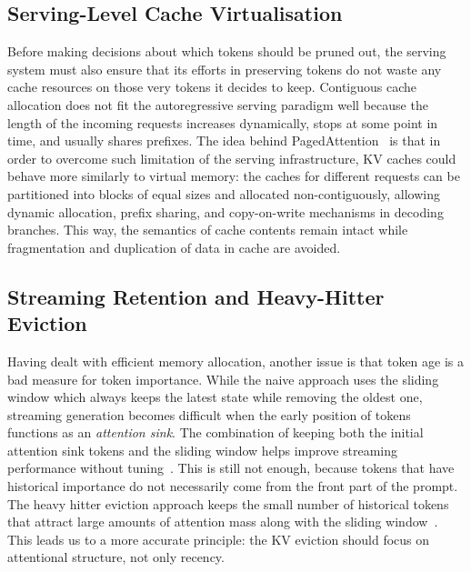 \documentclass[10pt]{article}
\begin{document}
\subsection{Serving-Level Cache Virtualisation}

Before making decisions about which tokens should be pruned out, the serving
system must also ensure that its efforts in preserving tokens do not waste any
cache resources on those very tokens it decides to keep. Contiguous cache
allocation does not fit the autoregressive serving paradigm well because the length
of the incoming requests increases dynamically, stops at some point in time, and
usually shares prefixes. The idea behind PagedAttention~\citep{kwon2023efficientmemorymanagementlarge}
is that in order to overcome such limitation of the serving infrastructure, KV
caches could behave more similarly to virtual memory: the caches for different
requests can be partitioned into blocks of equal sizes and allocated
non-contiguously, allowing dynamic allocation, prefix sharing, and copy-on-write
mechanisms in decoding branches. This way, the semantics of cache contents remain
intact while fragmentation and duplication of data in cache are avoided.

\subsection{Streaming Retention and Heavy-Hitter Eviction}

Having dealt with efficient memory allocation, another issue is that token age is a bad
measure for token importance. While the naive approach uses the sliding window which
always keeps the latest state while removing the oldest one, streaming generation
becomes difficult when the early position of tokens functions as an \emph{attention sink}.
The combination of keeping both the initial attention sink tokens and the sliding window
helps improve streaming performance without tuning~\citep{xiao2024efficientstreaminglanguagemodels}.
This is still not enough, because tokens that have historical importance do not necessarily
come from the front part of the prompt. The heavy hitter eviction approach keeps the small number
of historical tokens that attract large amounts of attention mass along with the sliding window~\citep{zhang2023h2oheavyhitteroracleefficient}.
This leads us to a more accurate principle: the KV eviction should focus on attentional structure,
not only recency.
\end{document}
